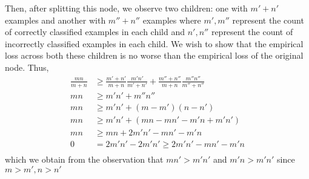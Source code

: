 \documentclass{article}
\begin{document}
Then, after splitting this node, we observe two children: one with \(m'+n'\) examples and another with \(m''+n''\) examples where \(m',m''\) represent the count of correctly classified examples in each child and \(n',n''\) represent the count of incorrectly classified examples in each child. We wish to show that the empirical loss across both these children is no worse than the empirical loss of the original node. Thus,
\begin{align*}
\frac{mn}{m+n} &\geq \frac{m'+n'}{m+n}\frac{m'n'}{m'+n'} + \frac{m''+n''}{m+n}\frac{m''n''}{m''+n''}\\
mn &\geq m'n' + m''n''\\
mn &\geq m'n' + (m-m')(n-n')\\
mn &\geq m'n' + (mn-mn'-m'n+m'n')\\
mn &\geq mn + 2m'n'-mn'-m'n\\
0 &= 2m'n' - 2m'n' \geq 2m'n' - mn' - m'n\\
\end{align*}
which we obtain from the observation that \(mn' > m'n'\) and \(m'n > m'n'\) since \(m > m', n > n'\)
\end{document}

